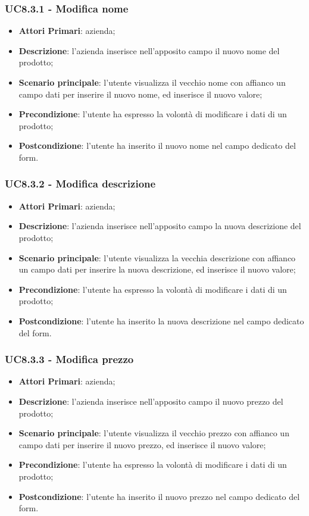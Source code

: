 \subsubsection{UC8.3.1 - Modifica nome}
\begin{itemize}
	\item \textbf{Attori Primari}: azienda;
	\item \textbf{Descrizione}: l'azienda inserisce nell'apposito campo il nuovo nome del prodotto;
	\item \textbf{Scenario principale}: l'utente visualizza il vecchio nome con affianco un campo dati per inserire il nuovo nome, ed inserisce il nuovo valore;
	\item \textbf{Precondizione}: l'utente ha espresso la volontà di modificare i dati di un prodotto;
	\item \textbf{Postcondizione}: l'utente ha inserito il nuovo nome nel campo dedicato del form.
\end{itemize}

\subsubsection{UC8.3.2 - Modifica descrizione}
\begin{itemize}
	\item \textbf{Attori Primari}: azienda;
	\item \textbf{Descrizione}: l'azienda inserisce nell'apposito campo la nuova descrizione del prodotto;
	\item \textbf{Scenario principale}: l'utente visualizza la vecchia descrizione con affianco un campo dati per inserire la nuova descrizione, ed inserisce il nuovo valore;
	\item \textbf{Precondizione}: l'utente ha espresso la volontà di modificare i dati di un prodotto;
	\item \textbf{Postcondizione}: l'utente ha inserito la nuova descrizione nel campo dedicato del form.
\end{itemize}

\subsubsection{UC8.3.3 - Modifica prezzo}
\begin{itemize}
	\item \textbf{Attori Primari}: azienda;
	\item \textbf{Descrizione}: l'azienda inserisce nell'apposito campo il nuovo prezzo del prodotto;
	\item \textbf{Scenario principale}: l'utente visualizza il vecchio prezzo con affianco un campo dati per inserire il nuovo prezzo, ed inserisce il nuovo valore;
	\item \textbf{Precondizione}: l'utente ha espresso la volontà di modificare i dati di un prodotto;
	\item \textbf{Postcondizione}: l'utente ha inserito il nuovo prezzo nel campo dedicato del form.
\end{itemize}

